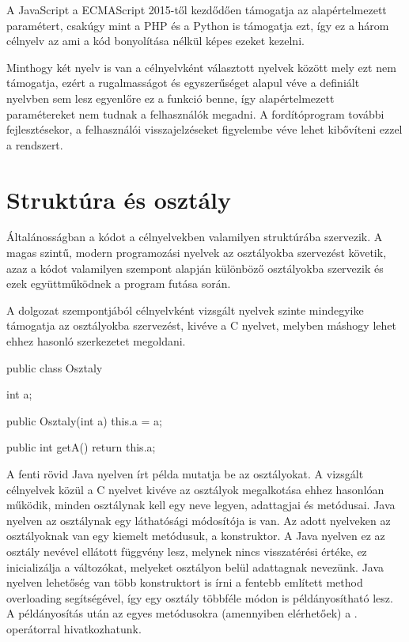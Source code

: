 A JavaScript a ECMAScript 2015-től kezdődően támogatja az alapértelmezett paramétert, csakúgy mint a PHP és a Python is támogatja ezt, így ez a három célnyelv az ami a kód bonyolítása nélkül képes ezeket kezelni.

Minthogy két nyelv is van a célnyelvként választott nyelvek között mely ezt nem támogatja, ezért a rugalmasságot és egyszerűséget alapul véve a definiált nyelvben sem lesz egyenlőre ez a funkció benne, így alapértelmezett paramétereket nem tudnak a felhasználók megadni. A fordítóprogram további fejlesztésekor, a felhasználói visszajelzéseket figyelembe véve lehet kibővíteni ezzel a rendszert.

\section{Struktúra és osztály}

Általánosságban a kódot a célnyelvekben valamilyen struktúrába szervezik. A magas szintű, modern programozási nyelvek az osztályokba szervezést követik, azaz a kódot valamilyen szempont alapján különböző osztályokba szervezik és ezek együttműködnek a program futása során.

A dolgozat szempontjából célnyelvként vizsgált nyelvek szinte mindegyike támogatja az osztályokba szervezést, kivéve a C nyelvet, melyben máshogy lehet ehhez hasonló szerkezetet megoldani.

\begin{cpp}
	public class Osztaly {
		int a;
		
		public Osztaly(int a) {
			this.a = a;
		}
	
		public int getA() {
			return this.a;
		}
	}
\end{cpp}

A fenti rövid Java nyelven írt példa mutatja be az osztályokat. A vizsgált célnyelvek közül a C nyelvet kivéve az osztályok megalkotása ehhez hasonlóan működik, minden osztálynak kell egy neve legyen, adattagjai és metódusai. Java nyelven az osztálynak egy láthatósági módosítója is van. Az adott nyelveken az osztályoknak van egy kiemelt metódusuk, a konstruktor. A Java nyelven ez az osztály nevével ellátott függvény lesz, melynek nincs visszatérési értéke, ez inicializálja a változókat, melyeket osztályon belül adattagnak nevezünk. Java nyelven lehetőség van több konstruktort is írni a fentebb említett method overloading segítségével, így egy osztály többféle módon is példányosítható lesz.
A példányosítás után az egyes metódusokra (amennyiben elérhetőek) a . operátorral hivatkozhatunk.

